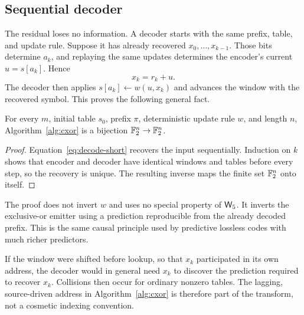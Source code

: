 \subsection{Sequential decoder}

The residual loses no information.  A decoder starts with the same prefix, table, and update
rule.  Suppose it has already recovered $x_0,\dots,x_{k-1}$.  Those bits determine $a_k$, and
replaying the same updates determines the encoder's current $u=s[a_k]$.  Hence
\begin{equation}\label{eq:decode-short}
  x_k=r_k+u.
\end{equation}
The decoder then applies $s[a_k]\leftarrow w(u,x_k)$ and advances the window with the recovered
symbol.  This proves the following general fact.

\begin{theorem}\label{thm:causal-inverse}
For every $m$, initial table $s_0$, prefix $\pi$, deterministic update rule $w$, and length $n$,
Algorithm~\ref{alg:cxor} is a bijection $\mathbb{F}_2^n\to\mathbb{F}_2^n$.
\end{theorem}

\begin{proof}
Equation~\eqref{eq:decode-short} recovers the input sequentially.  Induction on $k$ shows that
encoder and decoder have identical windows and tables before every step, so the recovery is
unique.  The resulting inverse maps the finite set $\mathbb{F}_2^n$ onto itself.
\end{proof}

The proof does not invert $w$ and uses no special property of $\mathsf{W}_{5}$.  It inverts the exclusive-or
emitter using a prediction reproducible from the already decoded prefix.  This is the same causal
principle used by predictive lossless codes with much richer predictors.

If the window were shifted before lookup, so that $x_k$ participated in its own address, the
decoder would in general need $x_k$ to discover the prediction required to recover $x_k$.
Collisions then occur for ordinary nonzero tables.  The lagging, source-driven address in
Algorithm~\ref{alg:cxor} is therefore part of the transform, not a cosmetic indexing convention.
